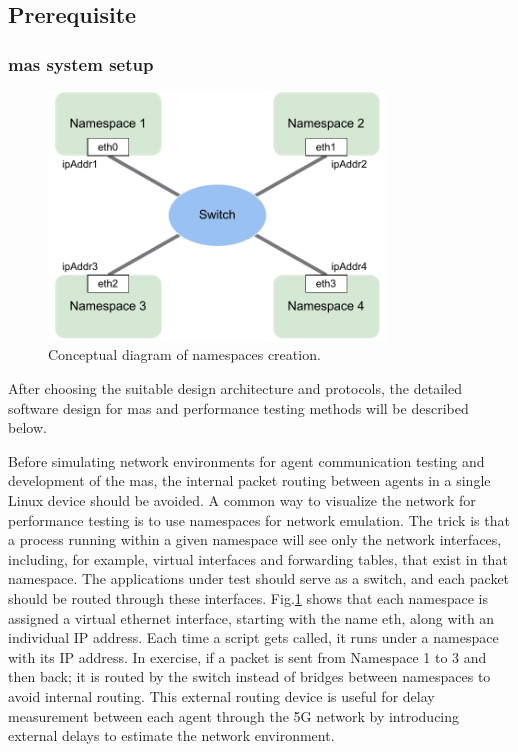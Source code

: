 \subsection{Prerequisite}
\subsubsection{\gls{mas} system setup}
 

\begin{figure}[htbp]
    \centering
\includegraphics[width=0.8\textwidth]{figures/NamespaceConceptual.pdf}
\caption{Conceptual diagram of namespaces creation.
\label{fig: NSConceptual}}
\end{figure}

After choosing the suitable design architecture and protocols, the detailed 
software design for \gls{mas} and performance testing methods will be described below. 

Before simulating network environments for agent communication testing 
and development of the \gls{mas}, the internal packet routing between agents 
in a single Linux device should be avoided. A common way to visualize 
the network for performance testing is to use namespaces for network 
emulation. The trick is that a process running within a given
namespace will see only the network interfaces, including, for example, 
virtual interfaces and forwarding tables, that exist in that namespace. 
The applications under test should serve as a
switch, and each packet should be routed through these interfaces. 
Fig.\ref{fig: NSConceptual} shows that each namespace is assigned 
a virtual ethernet interface, 
starting with the name eth, along with an individual IP address. 
Each time a script gets called, it runs under a namespace with its 
IP address. In exercise, if a packet is sent from
Namespace 1 to 3 and then back; it is routed by the switch instead of 
bridges between namespaces to avoid internal routing. This external routing 
device is useful for delay measurement between each agent through the 5G network 
by introducing external delays to estimate the network environment. 

